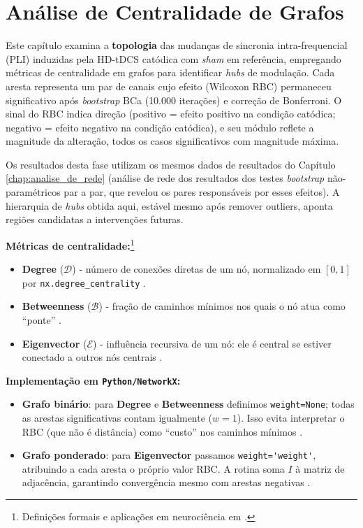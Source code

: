 \chapter{Análise de Centralidade de Grafos}
\label{chap:analise_centralidade_de_grafos}


Este capítulo examina a \textbf{topologia} das mudanças de sincronia intra-frequencial (PLI) induzidas pela HD-tDCS catódica com \textit{sham} em referência, empregando métricas de centralidade em grafos para identificar \textit{hubs} de modulação. Cada aresta representa um par de canais cujo efeito (Wilcoxon RBC) permaneceu significativo após \textit{bootstrap} BCa (10.000 iterações) e correção de Bonferroni. O sinal do RBC indica direção (positivo = efeito positivo na condição catódica; negativo = efeito negativo na condição catódica), e seu módulo reflete a magnitude da alteração, todos os casos significativos com magnitude máxima.

Os resultados desta fase utilizam os mesmos dados de resultados do Capítulo \ref{chap:analise_de_rede} (análise de rede dos resultados dos testes \textit{bootstrap} não-paramétricos par a par, que revelou os pares responsáveis por esses efeitos). A hierarquia de \textit{hubs} obtida aqui, estável mesmo após remover outliers, aponta regiões candidatas a intervenções futuras.

\bigskip
\noindent\textbf{Métricas de centralidade:}\footnote{Definições formais e aplicações em neurociência em .}
\begin{itemize}
  \item \textbf{Degree} (\(\mathcal{D}\)) - número de conexões diretas de um nó, normalizado em \([0,1]\) por \texttt{nx.degree\_centrality} \cite{networkx_doc}.
  \item \textbf{Betweenness} (\(\mathcal{B}\)) - fração de caminhos mínimos nos quais o nó atua como ``ponte'' \cite{freeman1977centrality}.
  \item \textbf{Eigenvector} (\(\mathcal{E}\)) - influência recursiva de um nó: ele é central se estiver conectado a outros nós centrais \cite{lohmann2010eigenvector}.
\end{itemize}

\noindent\textbf{Implementação em \texttt{Python/NetworkX}:}
\begin{itemize}
    \item \textbf{Grafo binário}: para \textbf{Degree} e \textbf{Betweenness} definimos \verb|weight=None|; todas as arestas significativas contam igualmente (\(w=1\)). Isso evita interpretar o RBC (que não é distância) como ``custo'' nos caminhos mínimos \cite{networkx_doc}.
    \item \textbf{Grafo ponderado}: para \textbf{Eigenvector} passamos \verb|weight='weight'|, atribuindo a cada aresta o próprio valor RBC. A rotina soma \(I\) à matriz de adjacência, garantindo convergência mesmo com arestas negativas \cite{networkx_doc}.
\end{itemize}

